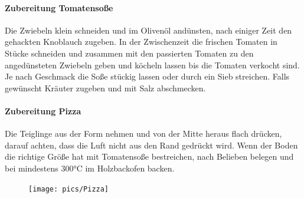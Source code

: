 \paragraph{Zubereitung Tomatensoße}
Die Zwiebeln klein schneiden und im Olivenöl andünsten, nach einiger Zeit den 
gehackten Knoblauch zugeben. In der Zwischenzeit die frischen Tomaten in 
Stücke schneiden und zusammen mit den passierten Tomaten zu den 
angedünsteten Zwiebeln geben und köcheln lassen bis die Tomaten verkocht 
sind. Je nach Geschmack die Soße stückig lassen oder durch ein Sieb streichen.
Falls gewünscht Kräuter zugeben und mit Salz abschmecken.

\paragraph{Zubereitung Pizza}
Die Teiglinge aus der Form nehmen und von der Mitte heraus flach drücken, 
darauf achten, dass die Luft nicht aus den Rand gedrückt wird. Wenn der Boden 
die richtige Größe hat mit Tomatensoße bestreichen, nach Belieben belegen 
und bei mindestens 300°C im Holzbackofen backen.
\newpage

\begin{figure}[htbp]
	\centering
	\begin{minipage}{1\textwidth}
		\centering
		\texttt{[image: pics/Pizza]}
		\label{fig:Pizza}
	\end{minipage}
\end{figure}
\newpage
